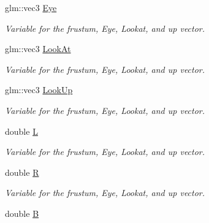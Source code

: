 \begin{DoxyCompactItemize}
\item 
glm\+::vec3 \hyperlink{classcft_1_1Scene_aeb18278aa4012ddd9785d41c8f2f0336}{Eye}\hypertarget{classcft_1_1Scene_aeb18278aa4012ddd9785d41c8f2f0336}{}\label{classcft_1_1Scene_aeb18278aa4012ddd9785d41c8f2f0336}

\begin{DoxyCompactList}\small\item\em Variable for the frustum, Eye, Lookat, and up vector. \end{DoxyCompactList}\item 
glm\+::vec3 \hyperlink{classcft_1_1Scene_ad888d51b46066721879fc553beb138d0}{Look\+At}\hypertarget{classcft_1_1Scene_ad888d51b46066721879fc553beb138d0}{}\label{classcft_1_1Scene_ad888d51b46066721879fc553beb138d0}

\begin{DoxyCompactList}\small\item\em Variable for the frustum, Eye, Lookat, and up vector. \end{DoxyCompactList}\item 
glm\+::vec3 \hyperlink{classcft_1_1Scene_aab4df259970cf4f6b87fd31d3ecd3675}{Look\+Up}\hypertarget{classcft_1_1Scene_aab4df259970cf4f6b87fd31d3ecd3675}{}\label{classcft_1_1Scene_aab4df259970cf4f6b87fd31d3ecd3675}

\begin{DoxyCompactList}\small\item\em Variable for the frustum, Eye, Lookat, and up vector. \end{DoxyCompactList}\item 
double \hyperlink{classcft_1_1Scene_a9b46bf1af33a0888509c2c8a52ea6929}{L}\hypertarget{classcft_1_1Scene_a9b46bf1af33a0888509c2c8a52ea6929}{}\label{classcft_1_1Scene_a9b46bf1af33a0888509c2c8a52ea6929}

\begin{DoxyCompactList}\small\item\em Variable for the frustum, Eye, Lookat, and up vector. \end{DoxyCompactList}\item 
double \hyperlink{classcft_1_1Scene_aaa9961bf231dcaad78516b419341e6f4}{R}\hypertarget{classcft_1_1Scene_aaa9961bf231dcaad78516b419341e6f4}{}\label{classcft_1_1Scene_aaa9961bf231dcaad78516b419341e6f4}

\begin{DoxyCompactList}\small\item\em Variable for the frustum, Eye, Lookat, and up vector. \end{DoxyCompactList}\item 
double \hyperlink{classcft_1_1Scene_a5b1e87d4c8ce27545a7277f4950b8f6d}{B}\hypertarget{classcft_1_1Scene_a5b1e87d4c8ce27545a7277f4950b8f6d}{}\label{classcft_1_1Scene_a5b1e87d4c8ce27545a7277f4950b8f6d}


\end{DoxyCompactItemize}
